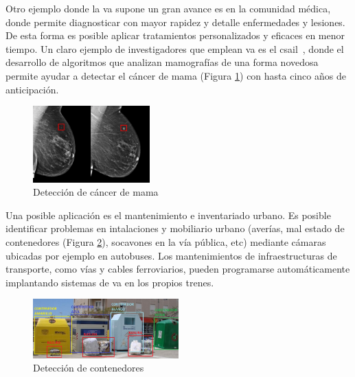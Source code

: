 Otro ejemplo donde la \acrshort{va} supone un gran avance es en la comunidad médica, donde permite diagnosticar con mayor rapidez y detalle enfermedades y lesiones. De esta forma es posible aplicar tratamientos personalizados y eficaces en menor tiempo. Un claro ejemplo de investigadores que emplean \acrshort{va} es el \acrfull{csail}~\cite{cancer}, donde el desarrollo de algoritmos que analizan mamografías de una forma novedosa permite ayudar a detectar el cáncer de mama (Figura \ref{fig.cancer}) con hasta cinco años de anticipación.\\

\begin{figure}[H]
  \begin{center}
    \includegraphics[width=0.4\textwidth]{figures/Introduccion/cancer.png}
		\caption{Detección de cáncer de mama}
		\label{fig.cancer}
		\end{center}
\end{figure}


Una posible aplicación es el mantenimiento e inventariado urbano. Es posible identificar problemas en intalaciones y mobiliario urbano (averías, mal estado de contenedores (Figura \ref{fig.contenedor}), socavones en la vía pública, etc) mediante cámaras ubicadas por ejemplo en autobuses. Los mantenimientos de infraestructuras de transporte, como vías y cables ferroviarios, pueden programarse automáticamente implantando sistemas de \acrshort{va} en los propios trenes. 


\begin{figure}[H]
  \begin{center}
    \includegraphics[width=0.5\textwidth]{figures/Introduccion/contenedor.png}
		\caption{Detección de contenedores}
		\label{fig.contenedor}
		\end{center}
\end{figure}

